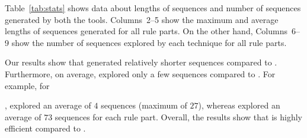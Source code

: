 Table~\ref{tab:stats} shows data about lengths of sequences and number 
of sequences generated by both the tools. Columns~2--5 show the maximum 
and average lengths of sequences generated for all rule parts. 
On the other hand, Columns~6--9 show the number of 
sequences explored by each technique for all rule parts. 

Our results show that \tool{} generated relatively shorter sequences
compared to \exhaust{}. Furthermore, on average, \tool{} explored
only a few sequences compared to \exhaust{}. For example,
for \subject{Cebu-pacific}, \tool{} explored an average of $4$ sequences
(maximum of $27$), whereas \exhaust{} explored an average of $73$ sequences
for each rule part. Overall, the results show that \tool{} is highly efficient
compared to \exhaust{}.
